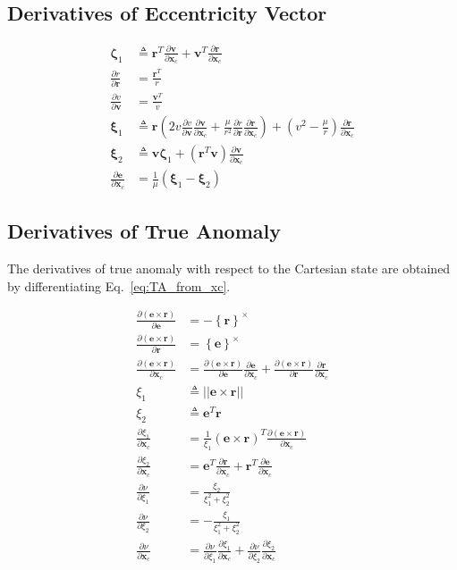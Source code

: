 \documentclass[]{article}
\newcommand{\vb}[1]{\bm{#1}} %
\newcommand{\pd}[2]{\frac{\partial #1}{\partial #2}} %
\newcommand{\xc}[0]{\vb{x}_c}
\begin{document}
\subsection{Derivatives of Eccentricity Vector}

\begin{align}
\vb{\zeta}_1 &\triangleq \vb{r}^T \pd{\vb{v}}{\xc} + \vb{v}^T \pd{\vb{r}}{\xc} \\
\pd{r}{\vb{r}} &= \frac{\vb{r}^T}{r} \\
\pd{v}{\vb{v}} &= \frac{\vb{v}^T}{v} \\
\vb{\xi}_1 &\triangleq \vb{r} \left( 2 v \pd{v}{\vb{v}} \pd{\vb{v}}{\xc} + \frac{\mu}{r^2} \pd{r}{\vb{r}} \pd{\vb{r}}{\xc} \right) + \left( v^2 - \frac{\mu}{r} \right) \pd{\vb{r}}{\xc} \\
\vb{\xi}_2 &\triangleq \vb{v} \vb{\zeta}_1 + \left( \vb{r}^T \vb{v} \right) \pd{\vb{v}}{\xc}  \\
\pd{\vb{e}}{\xc} &= \frac{1}{\mu} \left( \vb{\xi}_1 - \vb{\xi}_2 \right)
\end{align}

\subsection{Derivatives of True Anomaly}

The derivatives of true anomaly with respect to the Cartesian state are obtained by differentiating Eq.~\eqref{eq:TA_from_xc}.

\begin{align}
	\pd{\left( \vb{e} \times \vb{r} \right)}{\vb{e}} &= - \left\{ \vb{r} \right\}^{\times} \\
	\pd{\left( \vb{e} \times \vb{r} \right)}{\vb{r}} &= \left\{ \vb{e} \right\}^{\times} \\
	\pd{\left( \vb{e} \times \vb{r} \right)}{\xc} &= \pd{\left( \vb{e} \times \vb{r} \right)}{\vb{e}} \pd{\vb{e}}{\xc} + \pd{\left( \vb{e} \times \vb{r} \right)}{\vb{r}} \pd{\vb{r}}{\xc} \\
	\xi_1 &\triangleq || \vb{e} \times \vb{r} || \\
	\xi_2 &\triangleq \vb{e}^T \vb{r} \\ 
	\pd{\xi_1}{\xc} &= \frac{1}{\xi_1} \left( \vb{e} \times \vb{r} \right)^T \pd{\left( \vb{e} \times \vb{r} \right)}{\xc} \\
	\pd{\xi_2}{\xc} &= \vb{e}^T \pd{\vb{r}}{\xc} + \vb{r}^T \pd{\vb{e}}{\xc} \\
	\pd{\nu}{\xi_1} &= \frac{\xi_2}{\xi_1^2 + \xi_2^2} \\
	\pd{\nu}{\xi_2} &= - \frac{\xi_1}{\xi_1^2 + \xi_2^2} \\
	\pd{\nu}{\xc} &= \pd{\nu}{\xi_1} \pd{\xi_1}{\xc} + \pd{\nu}{\xi_2} \pd{\xi_2}{\xc}
\end{align}
\end{document}
